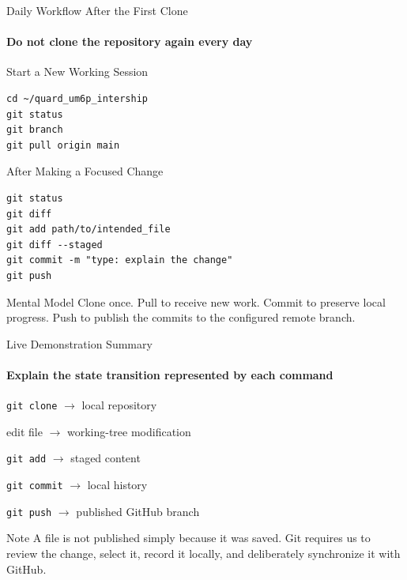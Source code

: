 \begin{frame}[fragile]{Daily Workflow After the First Clone}
\framesubtitle{Do not clone the repository again every day}

\footnotesize

\begin{block}{Start a New Working Session}
\begin{verbatim}
cd ~/quard_um6p_intership
git status
git branch
git pull origin main
\end{verbatim}
\end{block}

\begin{exampleblock}{After Making a Focused Change}
\begin{verbatim}
git status
git diff
git add path/to/intended_file
git diff --staged
git commit -m "type: explain the change"
git push
\end{verbatim}
\end{exampleblock}

\begin{alertblock}{Mental Model}
Clone once. Pull to receive new work. Commit to preserve local progress.
Push to publish the commits to the configured remote branch.
\end{alertblock}

\end{frame}

\begin{frame}{Live Demonstration Summary}
\framesubtitle{Explain the state transition represented by each command}

\footnotesize

\begin{center}
\scriptsize
\texttt{git clone}
$\longrightarrow$
local repository

\vspace{0.12cm}

edit file
$\longrightarrow$
working-tree modification

\vspace{0.12cm}

\texttt{git add}
$\longrightarrow$
staged content

\vspace{0.12cm}

\texttt{git commit}
$\longrightarrow$
local history

\vspace{0.12cm}

\texttt{git push}
$\longrightarrow$
published GitHub branch
\end{center}

\pause

\begin{exampleblock}{Note}
A file is not published simply because it was saved. Git requires us to
review the change, select it, record it locally, and deliberately
synchronize it with GitHub.
\end{exampleblock}

\end{frame}

